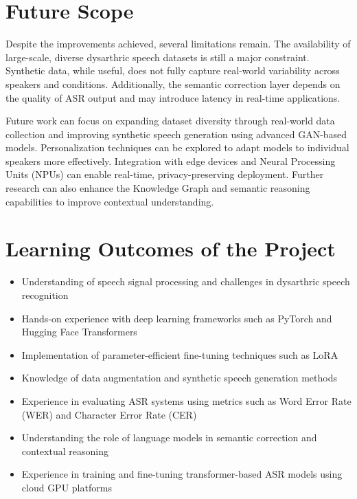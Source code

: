
\section{Future Scope}

Despite the improvements achieved, several limitations remain. The availability of large-scale, diverse dysarthric speech datasets is still a major constraint. Synthetic data, while useful, does not fully capture real-world variability across speakers and conditions. Additionally, the semantic correction layer depends on the quality of ASR output and may introduce latency in real-time applications.

Future work can focus on expanding dataset diversity through real-world data collection and improving synthetic speech generation using advanced GAN-based models. Personalization techniques can be explored to adapt models to individual speakers more effectively. Integration with edge devices and Neural Processing Units (NPUs) can enable real-time, privacy-preserving deployment. Further research can also enhance the Knowledge Graph and semantic reasoning capabilities to improve contextual understanding.

\section{Learning Outcomes of the Project}

\begin{itemize}
\item Understanding of speech signal processing and challenges in dysarthric speech recognition
\item Hands-on experience with deep learning frameworks such as PyTorch and Hugging Face Transformers
\item Implementation of parameter-efficient fine-tuning techniques such as LoRA
\item Knowledge of data augmentation and synthetic speech generation methods
\item Experience in evaluating ASR systems using metrics such as Word Error Rate (WER) and Character Error Rate (CER)
\item Understanding the role of language models in semantic correction and contextual reasoning
\item Experience in training and fine-tuning transformer-based ASR models using cloud GPU platforms
\end{itemize}